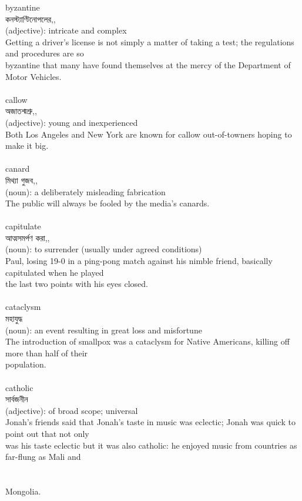 \documentclass{article}
\begin{document}
{byzantine}\\
{কনস্ট্যাণ্টিনোপলের,,}\\
{(adjective): intricate and complex\\Getting a driver's license is not simply a matter of taking a test; the regulations and procedures are so\\byzantine that many have found themselves at the mercy of the Department of Motor Vehicles.\\}\\
{callow}\\
{অজাতশ্মশ্রু,,}\\
{(adjective): young and inexperienced\\Both Los Angeles and New York are known for callow out-of-towners hoping to make it big.\\}\\
{canard}\\
{মিথ্যা গুজব,,}\\
{(noun): a deliberately misleading fabrication\\The public will always be fooled by the media's canards.\\}\\
{capitulate}\\
{আত্মসমর্পণ করা,,}\\
{(noun): to surrender (usually under agreed conditions)\\Paul, losing 19-0 in a ping-pong match against his nimble friend, basically capitulated when he played\\the last two points with his eyes closed.\\}\\
{cataclysm}\\
{মহাযুদ্ধ}\\
{(noun): an event resulting in great loss and misfortune\\The introduction of smallpox was a cataclysm for Native Americans, killing off more than half of their\\population.\\}\\
{catholic}\\
{সার্বজনীন}\\
{(adjective): of broad scope; universal\\Jonah's friends said that Jonah's taste in music was eclectic; Jonah was quick to point out that not only\\was his taste eclectic but it was also catholic: he enjoyed music from countries as far-flung as Mali and\\\\                                                                               \\Mongolia.\\}\\
\end{document}
